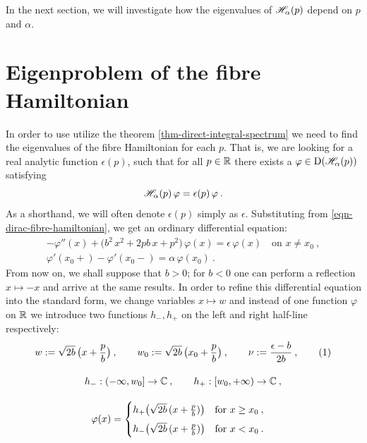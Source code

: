 In the next section, we will investigate how the eigenvalues of $\mathscr{H}_\alpha(p)$ depend on $p$ and $\alpha$.

\section{Eigenproblem of the fibre Hamiltonian}
In order to use utilize the theorem \ref{thm-direct-integral-spectrum} we need to find the eigenvalues of the fibre Hamiltonian for each $p$. That is, we are looking for a real analytic function $\epsilon(p)$, such that for all $p \in \mathbb{R}$ there exists a $\varphi \in \mathrm{D}(\mathscr{H}_\alpha(p))$ satisfying
\begin{equation*}
    \mathscr{H}_\alpha(p) \, \varphi = \epsilon(p) \, \varphi \: .
\end{equation*}
As a shorthand, we will often denote $\epsilon(p)$ simply as $\epsilon$. Substituting from \eqref{eqn-dirac-fibre-hamiltonian}, we get an ordinary differential equation:
\begin{gather*}
    -\varphi''(x)
    + \big( b^2 \, x^2 + 2 p b \, x + p^2 \big) \, \varphi(x)
    = \epsilon \, \varphi(x)
    \quad \text{on } x \neq x_0 \: ,
    \\
    \varphi'(x_0+) - \varphi'(x_0-) = \alpha \, \varphi(x_0)
    \: .
\end{gather*}
From now on, we shall suppose that $b>0$; for $b<0$ one can perform a reflection $x \mapsto -x$ and arrive at the same results. In order to refine this differential equation into the standard form, we change variables $x\mapsto w$ and instead of one function $\varphi$ on $\mathbb{R}$ we introduce two functions $h_-, h_+$ on the left and right half-line respectively:
\begin{gather*}
    w \coloneqq \sqrt{2b} \, \big( x + \frac{p}{b} \big) \: ,
    \qquad
    w_0 \coloneqq \sqrt{2b}\,\big( x_0 + \frac{p}{b} \big) \: ,
    \qquad
    \nu \coloneqq \frac{\epsilon - b}{2b} \: ,
    \numberthis
    \label{eqn-w-nu-definition}
    \\[10pt]
    h_-: (-\infty, w_0] \to \C \: , \qquad
    h_+: [w_0, +\infty) \to \C \: ,
    \\[10pt]
    \varphi(x) = \begin{cases}
        h_+ \big( \sqrt{2b} \, (x + \frac{p}{b}) \big)
        \quad \text{for } x \geq x_0 \: ,
        \\[5pt]
        h_- \big( \sqrt{2b} \, (x + \frac{p}{b}) \big)
        \quad \text{for } x < x_0 \: .
    \end{cases}
\end{gather*}
